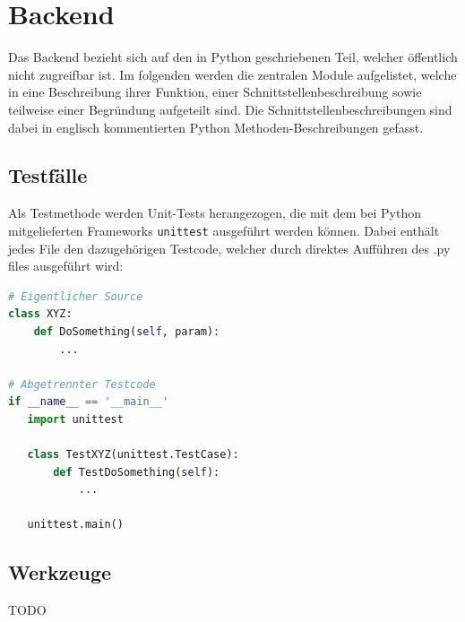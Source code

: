 \chapter{Backend}
\label{cha:backend}
Das Backend bezieht sich auf den in Python geschriebenen Teil, welcher
öffentlich nicht zugreifbar ist.
Im folgenden werden die zentralen Module aufgelistet, welche in eine
Beschreibung ihrer Funktion, einer Schnittstellenbeschreibung sowie
teilweise einer Begründung aufgeteilt sind.
Die Schnittstellenbeschreibungen sind dabei in englisch kommentierten Python Methoden-Beschreibungen gefasst. 

\section{Testfälle}
Als Testmethode werden Unit-Tests herangezogen, die mit dem bei Python mitgelieferten Frameworks \texttt{unittest}
ausgeführt werden können. Dabei enthält jedes File den dazugehörigen Testcode, welcher durch direktes Aufführen des
.py files ausgeführt wird:

\begin{lstlisting}[language=Python]
# Eigentlicher Source
class XYZ:
    def DoSomething(self, param):
        ...

# Abgetrennter Testcode
if __name__ == '__main__'
   import unittest

   class TestXYZ(unittest.TestCase):
       def TestDoSomething(self):
           ...

   unittest.main()
\end{lstlisting}

\section{Werkzeuge}
TODO

\newpage
